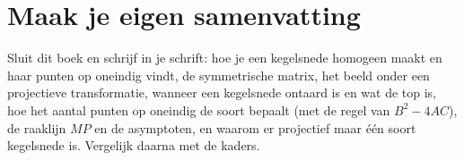 
\ifzelfstudie
\section*{Maak je eigen samenvatting}
Sluit dit boek en schrijf in je schrift: hoe je een kegelsnede homogeen maakt en haar punten op oneindig vindt, de symmetrische matrix, het beeld onder een projectieve transformatie, wanneer een kegelsnede ontaard is en wat de top is, hoe het aantal punten op oneindig de soort bepaalt (met de regel van $B^2 - 4AC$), de raaklijn $MP$ en de asymptoten, en waarom er projectief maar één soort kegelsnede is. Vergelijk daarna met de kaders.
\fi
